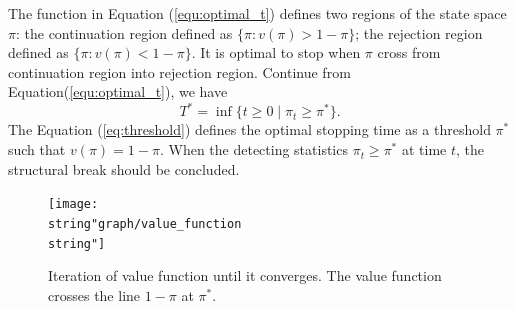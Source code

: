 \documentclass[preprint,authoryear,12pt,english]{elsarticle}
\theoremstyle{plain}
\begin{document}
The function in Equation (\ref{equ:optimal_t}) defines two regions of the state space $\pi$: the continuation region defined as $\{\pi : v(\pi)>1-\pi \}$; the rejection region defined as $\{\pi : v(\pi)<1-\pi \}$. It is optimal to stop when $\pi$ cross from continuation region into rejection region. Continue from Equation(\ref{equ:optimal_t}), we have
\begin{equation}
    T^{*} = \inf\{t\geq0 \mid \pi_{t}\geq\pi^{*}\}.\label{eq:threshold}
\end{equation}
The Equation (\ref{eq:threshold}) defines the optimal stopping time as a threshold $\pi^{*}$ such that $v(\pi)=1-\pi$. When the detecting statistics $\pi_{t} \geq \pi^{*}$ at time $t$, the structural break should be concluded.
\noindent \begin{center}
    \begin{figure}[H]
        \centering
        \begin{minipage}[c]{1\textwidth}
            \centering
            \texttt{[image: \\string"graph/value\_function\\string"]}
            \caption{Iteration of value function until it converges. The value function crosses the line $1-\pi$ at $\pi^{*}$.}
            \label{fig:value_function}
        \end{minipage}
    \end{figure}
\end{center}
\end{document}
